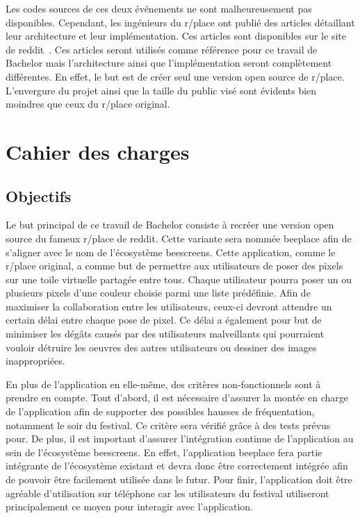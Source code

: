 Les codes sources de ces deux événements ne sont malheureusement pas disponibles. Cependant, les ingénieurs du r/place ont publié des articles détaillant leur architecture et leur implémentation. Ces articles sont disponibles sur le site de \gls{reddit}~\cite{rplace2017, rplace2022}. Ces articles seront utilisés comme référence pour ce travail de Bachelor mais l'architecture ainsi que l'implémentation seront complètement différentes. En effet, le but est de créer seul une version open source de r/place. L'envergure du projet ainsi que la taille du public visé sont évidents bien moindres que ceux du r/place original.

\section{Cahier des charges}
\label{sec:cdc}

\subsection{Objectifs}

Le but principal de ce travail de Bachelor consiste à recréer une version open source du fameux r/place de \gls{reddit}. Cette variante sera nommée \gls{beeplace} afin de s'aligner avec le nom de l'écosystème \gls{beescreens}.
Cette application, comme le r/place original, a comme but de permettre aux utilisateurs de poser des pixels sur une toile virtuelle partagée entre tous. Chaque utilisateur pourra poser un ou plusieurs pixels d'une couleur choisie parmi une liste prédéfinie. Afin de maximiser la collaboration entre les utilisateurs, ceux-ci devront attendre un certain délai entre chaque pose de pixel. Ce délai a également pour but de minimiser les dégâts causés par des utilisateurs malveillants qui pourraient vouloir détruire les oeuvres des autres utilisateurs ou dessiner des images inappropriées.

En plus de l'application en elle-même, des critères non-fonctionnels sont à prendre en compte. Tout d'abord, il est nécessaire d'assurer la montée en charge de l'application afin de supporter des possibles hausses de fréquentation, notamment le soir du festival. Ce critère sera vérifié grâce à des tests prévus pour. De plus, il est important d'assurer l'intégration continue de l'application au sein de l'écosystème \gls{beescreens}. En effet, l'application \gls{beeplace} fera partie intégrante de l'écosystème existant et devra donc être correctement intégrée afin de pouvoir être facilement utilisée dans le futur. Pour finir, l'application doit être agréable d'utilisation sur téléphone car les utilisateurs du festival utiliseront principalement ce moyen pour interagir avec l'application.

